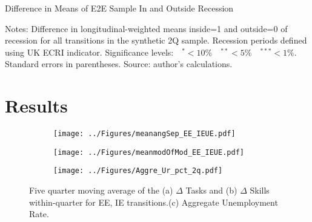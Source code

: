 \documentclass[12pt,authoryear]{elsarticle}
\begin{document}
	\newpage
	\thispagestyle{empty}
	\begin{table}[H]
		\centering
		\caption{Difference in Means of E2E Sample In and Outside Recession}\label{tab:diffMeans}
		\begin{adjustbox}{max width=16cm, max height=10cm}
			\begin{threeparttable}
				
				\begin{tablenotes}
					\item \footnotesize{Notes: Difference in longitudinal-weighted means inside=1 and outside=0 of recession for all transitions in the synthetic 2Q sample. Recession periods defined using UK ECRI indicator. Significance levels:$ \quad ^{*}<10\% \quad ^{**}<5\% \quad ^{***}<1\%$. Standard errors in parentheses. Source: author's calculations.}  
				\end{tablenotes}
			\end{threeparttable}
		\end{adjustbox}
	\end{table}
	\newpage
	
	\section{Results}
	\label{sec:results}
	
	
	

\newpage
\thispagestyle{empty}
	\begin{figure}
		\centering
		\begin{subfigure}[b]{1\textwidth}
			\texttt{[image: ../Figures/meanangSep\_EE\_IEUE.pdf]}
			\caption{}
			\label{fig:Ng1} 
		\end{subfigure}
		
		\begin{subfigure}[b]{1\textwidth}
			\texttt{[image: ../Figures/meanmodOfMod\_EE\_IEUE.pdf]}
			\caption{}
			\label{fig:Ng2}
		\end{subfigure}
				\begin{subfigure}[b]{1\textwidth}
			\texttt{[image: ../Figures/Aggre\_Ur\_pct\_2q.pdf]}
			\caption{}
			\label{fig:Ng3}
		\end{subfigure}
		\caption[Mean $\Delta$ Tasks and $\Delta$ Skills by Transition Type]{Five quarter moving average of the (a) $\Delta$ Tasks and (b) $\Delta$ Skills within-quarter for EE, IE transitions.(c) Aggregate Unemployment Rate.}
	\label{fig:TaskSkillsUR}
	\end{figure}
\end{document}
